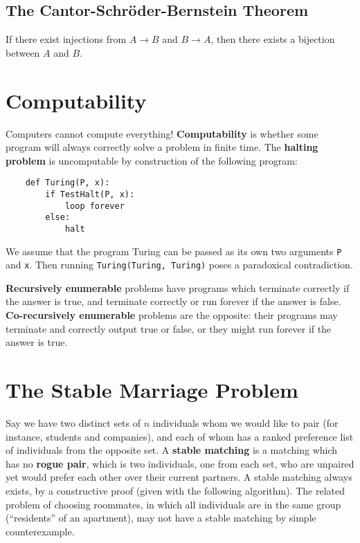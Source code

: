 \documentclass[12pt]{article}
\begin{document}
\subsection{The Cantor-Schr\"oder-Bernstein Theorem}

If there exist injections from $A \to B$ and $B \to A$, then there exists a bijection between $A$ and $B$.

\section{Computability}

Computers cannot compute everything! \textbf{Computability} is whether some program will always correctly solve a problem in finite time. The \textbf{halting problem} is uncomputable by construction of the following program:
\begin{verbatim}
    def Turing(P, x):
        if TestHalt(P, x):
            loop forever
        else:
            halt
\end{verbatim}
We assume that the program Turing can be passed as its own two arguments \texttt{P} and \texttt{x}. Then running \texttt{Turing(Turing, Turing)} poses a paradoxical contradiction.

\textbf{Recursively enumerable} problems have programs which terminate correctly if the answer is true, and terminate correctly or run forever if the answer is false. \textbf{Co-recursively enumerable} problems are the opposite: their programs may terminate and correctly output true or false, or they might run forever if the answer is true.

\section{The Stable Marriage Problem}

Say we have two distinct sets of $n$ individuals whom we would like to pair (for instance, students and companies), and each of whom has a ranked preference list of individuals from the opposite set. A \textbf{stable matching} is a matching which has no \textbf{rogue pair}, which is two individuals, one from each set, who are unpaired yet would prefer each other over their current partners. A stable matching always exists, by a constructive proof (given with the following algorithm). The related problem of choosing roommates, in which all individuals are in the same group (``residents'' of an apartment), may not have a stable matching by simple counterexample.
\end{document}
